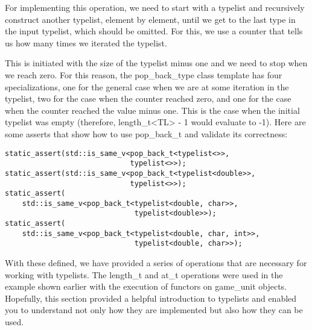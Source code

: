 For implementing this operation, we need to start with a typelist and recursively construct another typelist, element by element, until we get to the last type in the input typelist, which should be omitted. For this, we use a counter that tells us how many times we iterated the typelist.

This is initiated with the size of the typelist minus one and we need to stop when we reach zero. For this reason, the pop\_back\_type class template has four specializations, one for the general case when we are at some iteration in the typelist, two for the case when the counter reached zero, and one for the case when the counter reached the value minus one. This is the case when the initial typelist was empty (therefore, length\_t<TL> - 1 would evaluate to -1). Here are some asserts that show how to use pop\_back\_t and validate its correctness:

\begin{lstlisting}[style=styleCXX]
static_assert(std::is_same_v<pop_back_t<typelist<>>,
							 typelist<>>);
static_assert(std::is_same_v<pop_back_t<typelist<double>>,
							 typelist<>>);
static_assert(
	std::is_same_v<pop_back_t<typelist<double, char>>,
							  typelist<double>>);
static_assert(
	std::is_same_v<pop_back_t<typelist<double, char, int>>,
							  typelist<double, char>>);
\end{lstlisting}

With these defined, we have provided a series of operations that are necessary for working with typelists. The length\_t and at\_t operations were used in the example shown earlier with the execution of functors on game\_unit objects. Hopefully, this section provided a helpful introduction to typelists and enabled you to understand not only how they are implemented but also how they can be used.



















